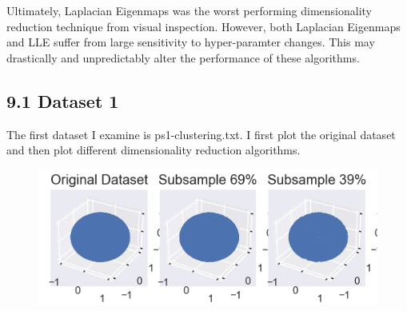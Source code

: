 \documentclass{article}
\begin{document}
        Ultimately, Laplacian Eigenmaps was the worst performing dimensionality reduction technique from visual inspection. However, both Laplacian Eigenmaps and LLE suffer from large sensitivity to hyper-paramter changes. This may drastically and unpredictably alter the performance of these algorithms. 

        \subsection*{9.1 Dataset 1}
            The first dataset I examine is ps1-clustering.txt. I first plot the original dataset and then plot different dimensionality reduction algorithms.
 
            \begin{figure}[h]
                \label{fig:ps1_clustering_original}
                \includegraphics[]{images/ps1-dataset1-original.png}
            \end{figure}
\end{document}
